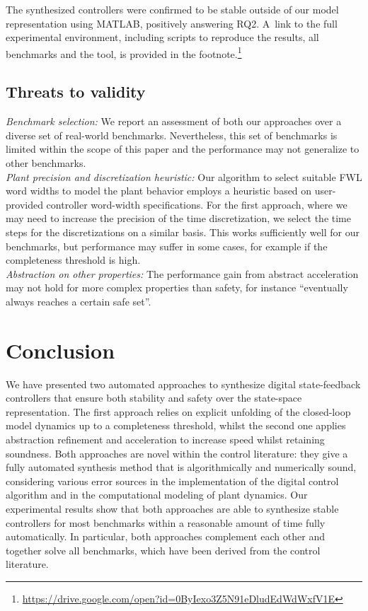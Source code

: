 \documentclass[runningheads,a4paper]{llncs}
\begin{document}
The synthesized controllers were confirmed to be stable outside of our model
representation using MATLAB, positively answering RQ2.  A~link to the full
experimental environment, including scripts to reproduce the results, all
benchmarks and the tool, is provided in the
footnote.\footnote{\url{https://drive.google.com/open?id=0ByIexo3Z5N91eDludEdWdWxfV1E}}


\subsection{Threats to validity}

\textit{Benchmark selection:} We report an assessment of both our approaches
over a diverse set of real-world benchmarks.  Nevertheless, this set of
benchmarks is limited within the scope of this paper and the performance may
not generalize to other benchmarks.\\
%
\textit{Plant precision and discretization heuristic:} Our algorithm to
select suitable FWL word widths to model the plant behavior employs a
heuristic based on user-provided controller word-width specifications.  For
the first approach, where we may need to increase the precision of the time
discretization, we select the time steps for the discretizations on a
similar basis.  This works sufficiently well for our benchmarks, but
performance may suffer in some cases, for example if the completeness
threshold is high.\\
%
\textit{Abstraction on other properties:} The performance gain from abstract
acceleration may not hold for more complex properties than safety, for
instance ``eventually always reaches a certain safe set''.

\section{Conclusion}

We have presented two automated approaches to synthesize digital
state-feedback controllers that ensure both stability and safety over the
state-space representation.  The first approach relies on explicit unfolding
of the closed-loop model dynamics up to a completeness threshold, whilst the
second one applies abstraction refinement and acceleration to increase speed
whilst retaining soundness.
%
Both approaches are novel within the control literature: they give a fully
automated synthesis method that is algorithmically and numerically sound,
considering various error sources in the implementation of the digital
control algorithm and in the computational modeling of plant dynamics.
%
Our experimental results show that both approaches are able to synthesize
stable controllers for most benchmarks within a reasonable amount of time
fully automatically.  In particular, both approaches complement each other
and together solve all benchmarks, which have been derived from the control
literature.
\end{document}
